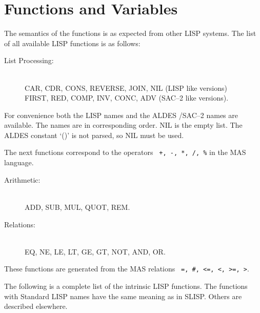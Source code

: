 \section{Functions and Variables}

The semantics of the functions is as expected 
from other LISP systems.
The list of all available 
LISP functions is as follows: 

\begin{description}
\item[List Processing:] \mbox{ }
      \\
      CAR, CDR, CONS, 
      REVERSE, JOIN, NIL 
      (LISP like versions)
      \\
      FIRST, RED, COMP, 
      INV, CONC, ADV 
      (SAC--2 like versions).
\end{description}

For convenience both the LISP names and the ALDES /SAC--2 names
are available. The names are in corresponding order. 
NIL is the empty list. The ALDES constant `()' is not parsed, so
NIL must be used. 

The next functions correspond to the operators 
\verb. +, -, *, /, %. in the MAS language.

\begin{description}
\item[Arithmetic:] \mbox{ }
      \\
      ADD, SUB, MUL, 
      QUOT, REM.
\end{description}

\begin{description}
\item[Relations:] \mbox{ }
     \\
     EQ, NE, LE, LT, GE, GT, 
     NOT, AND, OR.
\end{description}

These functions are generated from the MAS relations  
\verb. =, #, <=, <, >=, >..

The following is a complete list of the intrinsic LISP
functions. The functions with Standard LISP names 
have the same meaning as in SLISP. Others are described 
elsewhere.

